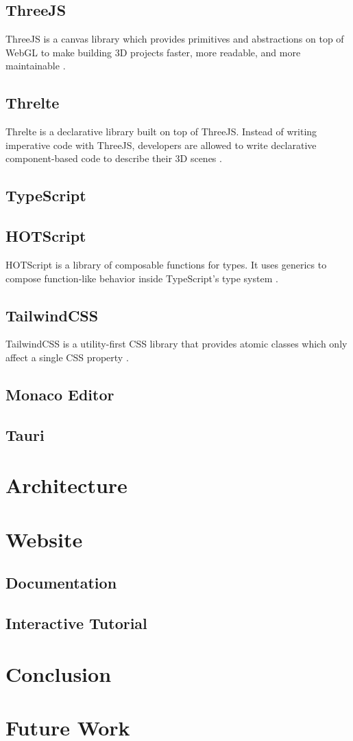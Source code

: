 \documentclass{article}
\begin{document}
\subsection{ThreeJS}
ThreeJS is a canvas library which provides primitives and abstractions on top of WebGL to make building 3D projects faster, more readable, and more maintainable \cite{threejs}.

\subsection{Threlte}
Threlte is a declarative library built on top of ThreeJS. Instead of writing imperative code with ThreeJS, developers are allowed to write declarative component-based code to describe their 3D scenes \cite{threlte}.

\subsection{TypeScript}

\subsection{HOTScript}
HOTScript is a library of composable functions for types. It uses generics to compose function-like behavior inside TypeScript’s type system \cite{hotscript}.

\subsection{TailwindCSS}
TailwindCSS is a utility-first CSS library that provides atomic classes which only affect a single CSS property \cite{tailwindcss}.

\subsection{Monaco Editor}

\subsection{Tauri}

\section{Architecture}

\section{Website}
\subsection{Documentation}
\subsection{Interactive Tutorial}
\section{Conclusion}
\section{Future Work}
\printbibliography
\end{document}

